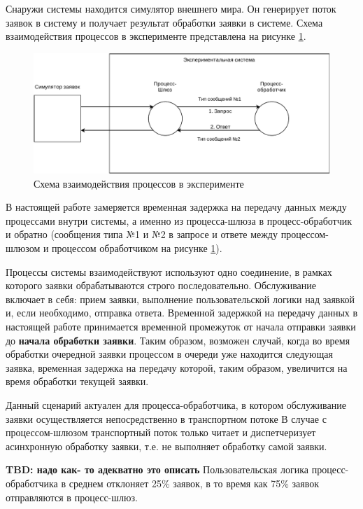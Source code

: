 Снаружи системы находится симулятор внешнего мира. Он генерирует поток заявок в систему и получает результат обработки заявки в системе. Схема взаимодействия процессов в эксперименте представлена на рисунке \ref{chapter41:SystemSchema}.

\begin{figure}[!h]
\caption{Схема взаимодействия процессов в эксперименте}
\label{chapter41:SystemSchema}
\includegraphics[width=\textwidth]{../../graphics/schemes/SystemSchema}
\end{figure}

В настоящей работе замеряется временная задержка на передачу данных между процессами внутри системы, а именно из процесса-шлюза в процесс-обработчик и обратно (сообщения типа №1 и №2 в запросе и ответе между процессом-шлюзом и процессом обработчиком на рисунке \ref{chapter41:SystemSchema}).

Процессы системы взаимодействуют используют одно соединение, в рамках которого заявки обрабатываются строго последовательно.
Обслуживание включает в себя: прием заявки, выполнение пользовательской логики над заявкой и, если необходимо, отправка ответа.
Временной задержкой на передачу данных в настоящей работе принимается временной промежуток от начала отправки заявки до \textbf{начала обработки заявки}. Таким образом, возможен случай, когда во время обработки очередной заявки процессом в очереди уже находится следующая заявка, временная задержка на передачу которой, таким образом, увеличится на время обработки текущей заявки.

Данный сценарий актуален для процесса-обработчика, в котором обслуживание заявки осуществляется непосредственно в транспортном потоке
В случае с процессом-шлюзом транспортный поток только читает и диспетчеризует асинхронную обработку заявки, т.е. не выполняет обработку самой заявки.

\textbf{TBD: надо как- то адекватно это описать}
Пользовательская логика процесс-обработчика в среднем отклоняет 25\% заявок, в то время как 75\% заявок отправляются в процесс-шлюз.

